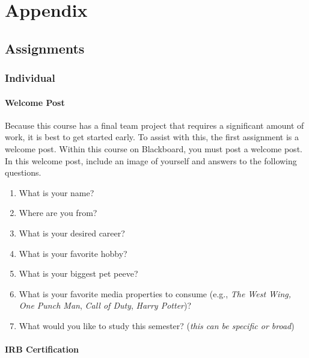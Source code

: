 \documentclass[
  b5paper]{book}
\providecommand{\tightlist}{%
  \setlength{\itemsep}{0pt}\setlength{\parskip}{0pt}}
\begin{document}
\hypertarget{appendix}{%
\chapter{Appendix}\label{appendix}}

\hypertarget{assignments}{%
\section{Assignments}\label{assignments}}

\hypertarget{individual}{%
\subsection*{Individual}\label{individual}}

\hypertarget{welcome-post}{%
\subsubsection*{Welcome Post}\label{welcome-post}}

Because this course has a final team project that requires a significant amount of work, it is best to get started early. To assist with this, the first assignment is a welcome post. Within this course on Blackboard, you must post a welcome post. In this welcome post, include an image of yourself and answers to the following questions.

\begin{enumerate}
\def\labelenumi{\arabic{enumi}.}
\tightlist
\item
  What is your name?
\item
  Where are you from?
\item
  What is your desired career?
\item
  What is your favorite hobby?
\item
  What is your biggest pet peeve?
\item
  What is your favorite media properties to consume (e.g., \emph{The West Wing,} \emph{One Punch Man}, \emph{Call of Duty}, \emph{Harry Potter})?
\item
  What would you like to study this semester? (\emph{this can be specific or broad})
\end{enumerate}

\hypertarget{irb-certification}{%
\subsubsection*{IRB Certification}\label{irb-certification}}
\end{document}
